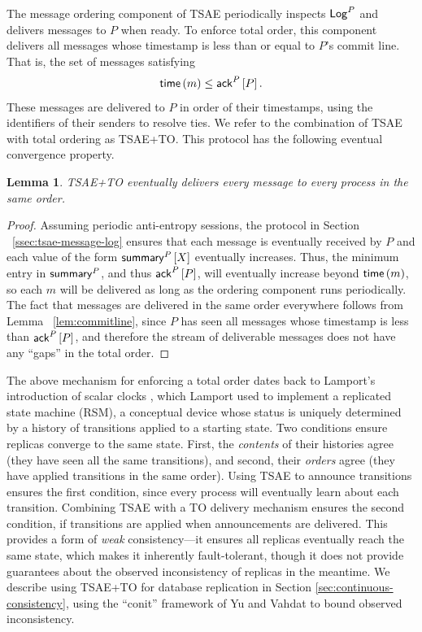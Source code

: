 \documentclass[]             %
{NASA}                       %
\newtheorem{lemma}[theorem]{Lemma}
\theoremstyle{definition}
\begin{document}
The message ordering component of TSAE periodically inspects $\mathsf{Log}^{P}$
and delivers messages to $P$ when ready. To enforce total order, this
component delivers all messages whose timestamp is less than or equal
to $P$'s commit line. That is, the set of messages satisfying
\begin{equation}
  \label{eq:tsae-message-ordering-condition}
  \mathsf{time}\left(m\right) \leq \mathsf{ack}^{P}\left[P\right].
\end{equation}
These messages are delivered to $P$ in order of their timestamps,
using the identifiers of their senders to resolve ties. We refer to
the combination of TSAE with total ordering as TSAE+TO. This protocol
has the following eventual convergence property.

\begin{lemma}
  TSAE+TO eventually delivers every message to every process in the
  same order.
\end{lemma}
\begin{proof}
  Assuming periodic anti-entropy sessions, the protocol in Section
 ~\ref{ssec:tsae-message-log} ensures that each message is eventually
  received by $P$ and each value of the form $\mathsf{summary}^{P}\left[X\right]$
  eventually increases. Thus, the minimum entry in $\mathsf{summary}^{P}$,
  and thus $\mathsf{ack}^{P}\left[P\right]$, will eventually increase beyond
  $\mathsf{time}\left(m\right)$, so each $m$ will be delivered as long as the
  ordering component runs periodically. The fact that messages are
  delivered in the same order everywhere follows from Lemma
 ~\ref{lem:commitline}, since $P$ has seen all messages whose
  timestamp is less than $\mathsf{ack}^{P}\left[P\right]$, and therefore the stream of
  deliverable messages does not have any ``gaps'' in the total order.
\end{proof}

The above mechanism for enforcing a total order dates back to
Lamport's introduction of scalar clocks \cite{1978:lamportclocks},
which Lamport used to implement a replicated state machine (RSM), a
conceptual device whose status is uniquely determined by a history of
transitions applied to a starting state. Two conditions ensure
replicas converge to the same state. First, the \emph{contents} of
their histories agree (they have seen all the same transitions), and
second, their \emph{orders} agree (they have applied transitions in
the same order). Using TSAE to announce transitions ensures the first
condition, since every process will eventually learn about each
transition. Combining TSAE with a TO delivery mechanism ensures the
second condition, if transitions are applied when announcements are
delivered. This provides a form of \emph{weak} consistency---it
ensures all replicas eventually reach the same state, which makes it
inherently fault-tolerant, though it does not provide guarantees about
the observed inconsistency of replicas in the meantime. We describe
using TSAE+TO for database replication in Section
\ref{sec:continuous-consistency}, using the ``conit'' framework of Yu
and Vahdat \cite{2002tact} to bound observed inconsistency.
\end{document}
